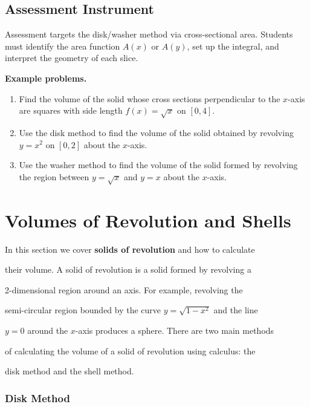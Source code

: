\subsection{Assessment Instrument}
\label{ssec:dete-251d}

Assessment targets the disk/washer method via cross-sectional area. Students must identify the area function $A(x)$ or $A(y)$, set up the integral, and interpret the geometry of each slice.

\textbf{Example problems.}

\begin{enumerate}
    \item Find the volume of the solid whose cross sections perpendicular to the $x$-axis are squares with side length $f(x) = \sqrt{x}$ on $[0,4]$.
    \item Use the disk method to find the volume of the solid obtained by revolving $y = x^2$ on $[0,2]$ about the $x$-axis.
    \item Use the washer method to find the volume of the solid formed by revolving the region between $y=\sqrt{x}$ and $y=x$ about the $x$-axis.
\end{enumerate}

\section{Volumes of Revolution and Shells}
\label{sec:volu-a692}

In this section we cover \textbf{solids of revolution} and how to calculate

their volume. A solid of revolution is a solid formed by revolving a

2-dimensional region around an axis. For example, revolving the

semi-circular region bounded by the curve $y=\sqrt{1-x^2}$ and the line

$y=0$ around the $x$-axis produces a sphere. There are two main methods

of calculating the volume of a solid of revolution using calculus: the

disk method and the shell method.


\subsubsection{Disk Method}
\label{sss:disk-f7dd}

